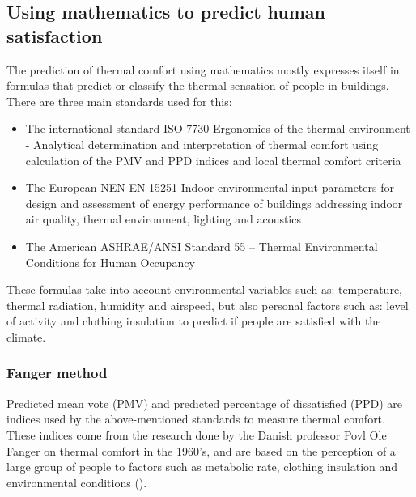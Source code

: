 \documentclass[12pt,a4paper]{article}
\begin{document}
\subsection{Using mathematics to predict human satisfaction}
The prediction of thermal comfort using mathematics mostly expresses itself in formulas that predict or classify the thermal sensation of people in buildings. There are three main standards used for this:

\begin{itemize}
	\item The international standard ISO 7730 Ergonomics of the thermal environment - Analytical determination and interpretation of thermal comfort using calculation of the PMV and PPD indices and local thermal comfort criteria
	\item The European NEN-EN 15251 Indoor environmental input parameters for design and assessment of energy performance of buildings addressing indoor air quality, thermal environment, lighting and acoustics
	\item The American ASHRAE/ANSI Standard 55 – Thermal Environmental Conditions for Human Occupancy
\end{itemize}

These formulas take into account environmental variables such as: temperature, thermal radiation, humidity and airspeed, but also personal factors such as: level of activity and clothing insulation to predict if people are satisfied with the climate.

\subsubsection{Fanger method}
Predicted mean vote (PMV) and predicted percentage of dissatisfied (PPD) are indices used by the above-mentioned standards to measure thermal comfort. These indices come from the research done by the Danish professor Povl Ole Fanger on thermal comfort in the 1960's, and are based on the perception of a large group of people to factors such as metabolic rate, clothing insulation and environmental conditions (\cite{Fanger1972ThermalCA}).
\end{document}
